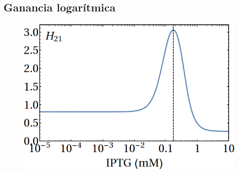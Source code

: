 \documentclass[xcolor=dvipsnames]{beamer}
\begin{document}

\subsection{Ganancia logar\'itmica}
\begin{frame}
\begin{figure}[p]
    \centering
    \includegraphics[width=.7\textwidth]{lan-H21.png}\\
\end{figure}
\end{frame}
\end{document}
